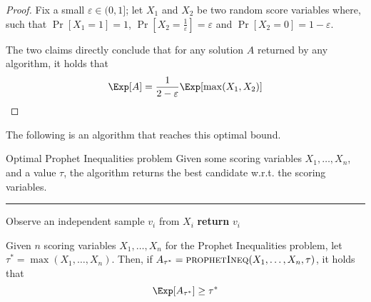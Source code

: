 \documentclass[a4paper, 12pt]{report}
\begin{document}
    \begin{proof}
        Fix a small $\varepsilon \in (0, 1]$; let $X_1$ and $X_2$ be two random score variables where, such that $\Pr[X_1 = 1] = 1$, $\Pr[X_2 = \tfrac{1}{\varepsilon}] = \varepsilon$ and $\Pr[X_2 = 0] = 1 - \varepsilon$.



        The two claims directly conclude that for any solution $A$ returned by any algorithm, it holds that $$\Exp[A] = \dfrac{1}{2 - \varepsilon} \Exp[\max(X_1, X_2)]$$
    \end{proof}

    The following is an algorithm that reaches this optimal bound.

    \begin{framedalgo}[]{Optimal Prophet Inequalities problem}
        Given some scoring variables $X_1, \ldots, X_n$, and a value $\tau$, the algorithm returns the best candidate w.r.t. the scoring variables. \\
        \hrule

        \quad
        \begin{algorithmic}[1]
                    \State Observe an independent sample $v_i$ from $X_i$
                        \State \textbf{return} $v_i$
                    \EndIf
                \EndFor
            \EndFunction
        \end{algorithmic}
    \end{framedalgo}

    \begin{framedthm}{}
        Given $n$ scoring variables $X_1, \ldots, X_n$ for the Prophet Inequalities problem, let $\tau^* = \max(X_1, \ldots, X_n)$. Then, if $A_{\tau^*} = \textsc{prophetIneq}(X_1, \ldots, X_n, \tau)$, it holds that $$\Exp[A_{\tau^*}] \ge \tau^*$$
    \end{framedthm}
\end{document}
